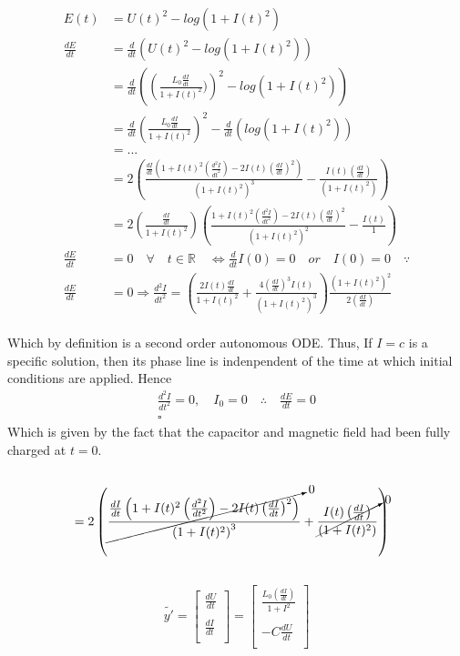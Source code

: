 \documentclass[a4paper]{article}
\begin{document}
\begin{align*}
E(t) & = U(t)^{2}-log(1+I(t)^{2})\\
\frac{dE}{dt} & = \frac{d}{dt}\left(U(t)^{2}-log(1+I(t)^{2})\right)\\
 & = \frac{d}{dt}\left(\left(\frac{L_{0}\frac{dI}{dt}}{1+I(t)^{2}})\right)^{2}-log\left(1+I(t)^{2}\right)\right) \\
& = \frac{d}{dt}\left(\frac{L_{0}\frac{dI}{dt}}{1+I(t)^{2}}\right)^{2}-\frac{d}{dt}\left(log\left(1+I(t)^{2}\right)\right)\\
& = ...\\
& = 2\left({\frac{\frac{dI}{dt}\left(1+I(t)^{2}\left(\frac{d^{2}I}{dt^{2}}\right)-2I(t)\left(\frac{dI}{dt}\right)^{2}\right)}{\left(1+I(t)^{2}\right)^{3}}} -   {\frac{I(t)\left(\frac{dI}{dt}\right)}{\left(1+I(t)^{2}\right)}}\right)\\
& = 2\left(\frac{\frac{dI}{dt}}{1+I(t)^{2}}\right)   \left({\frac{1+I(t)^{2}\left(\frac{d^{2}I}{dt^{2}}\right)-2I(t)\left(\frac{dI}{dt}\right)^{2}}{\left(1+I(t)^{2}\right)^{2}}} -   {\frac{I(t)}{1}}\right)\\
\frac{dE}{dt} & = 0 \quad \forall \quad t \in \mathbb{R} \quad \Longleftrightarrow \frac{d}{dt}I(0) = 0 \quad or \quad I(0)= 0 \quad \because \\
\frac{dE}{dt} &= 0 \Longrightarrow 
{\frac{d^{2}I}{dt^{2}}}=\left(\frac{2I(t)\frac{dI}{dt}}{1+I(t)^{2}}+\frac{4\left(\frac{dI}{dt}\right)^{3}I(t)}{\left(1+I(t)^{2}\right)^{3}}\right)\frac{\left(1+I(t)^{2}\right)^{2}}{2\left(\frac{dI}{dt}\right)}
\end{align*}\\
Which by definition is a second order autonomous ODE. Thus, If $I=c$ is a specific solution, then its phase line is indenpendent of the time at which initial conditions are applied. Hence
\begin{align*}
\frac{d^{2}I}{dt^{2}}=0,\quad I_{0}=0 \quad \therefore\quad\frac{dE}{dt}=0\\
\square
\end{align*}
Which is given by the fact that the capacitor and magnetic field had been fully charged at $t=0$.

\begin{align*}
\end{align*}
\begin{align*}
& = 2\left(\cancelto{0}{\frac{\frac{dI}{dt}\left(1+I(t)^{2}\left(\frac{d^{2}I}{dt^{2}}\right)-2I(t)\left(\frac{dI}{dt}\right)^{2}\right)}{\left(1+I(t)^{2}\right)^{3}}} +   \cancelto{0}{\frac{I(t)\left(\frac{dI}{dt}\right)}{\left(1+I(t)^{2}\right)}}\right)
\end{align*}\\

\begin{align*}
\tilde{y'}=
\begin{bmatrix}
\frac{dU}{dt}\\ \\ 
\frac{dI}{dt}\\
\end{bmatrix}
= \begin{bmatrix}
\frac{L_{0}\left(\frac{dI}{dt}\right)}{1+I^{2}}\\\\
-C\frac{dU}{dt}\\
\end{bmatrix}
\end{align*}
\end{document}
